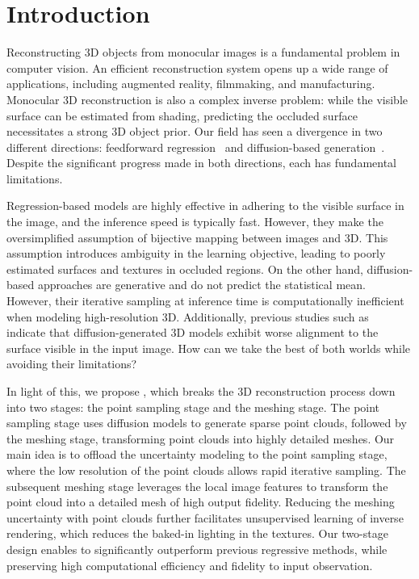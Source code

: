 \section{Introduction}
\label{sec:intro}

Reconstructing 3D objects from monocular images is a fundamental problem in computer vision. An efficient reconstruction system opens up a wide range of applications, including augmented reality, filmmaking, and manufacturing. Monocular 3D reconstruction is also a complex inverse problem: while the visible surface can be estimated from shading, predicting the occluded surface necessitates a strong 3D object prior. Our field has seen a divergence in two different directions: feedforward regression~\cite{choy20163d,wang2018pixel2mesh,mescheder2019occupancy,xu2019disn,groueix2018,wu2017marrnet,huang2023shapeclipper,wu2023multiview,huang2024zeroshape,hong2023lrm,TripoSR2024,tang2024lgm,zhang2024gs,xu2024instantmesh,wang2024crm,sf3d2024} and diffusion-based generation~\cite{nichol2022point,jun2023shap,liu2023one2345++,shue20233d,chou2023diffusion,shim2023diffusion,cheng2023sdfusion,li2023diffusion,liu2023zero,shi2023mvdream,liu2023syncdreamer,huang2024pointinfinity,yariv2024mosaic,chen2023single,zhao2023michelangelo,lan2024ln3diff}. Despite the significant progress made in both directions, each has fundamental limitations.

Regression-based models are highly effective in adhering to the visible surface in the image, and the inference speed is typically fast. However, they make the oversimplified assumption of bijective mapping between images and 3D. This assumption introduces ambiguity in the learning objective, leading to poorly estimated surfaces and textures in occluded regions. On the other hand, diffusion-based approaches are generative and do not predict the statistical mean. However, their iterative sampling at inference time is computationally inefficient when modeling high-resolution 3D. Additionally, previous studies such as~\cite{huang2024zeroshape} indicate that diffusion-generated 3D models exhibit worse alignment to the surface visible in the input image. How can we take the best of both worlds while avoiding their limitations?

In light of this, we propose \method, which breaks the 3D reconstruction process down into two stages: the point sampling stage and the meshing stage. The point sampling stage uses diffusion models to generate sparse point clouds, followed by the meshing stage, transforming point clouds into highly detailed meshes. Our main idea is to offload the uncertainty modeling to the point sampling stage, where the low resolution of the point clouds allows rapid iterative sampling. The subsequent meshing stage leverages the local image features to transform the point cloud into a detailed mesh of high output fidelity. Reducing the meshing uncertainty with point clouds further facilitates unsupervised learning of inverse rendering, which reduces the baked-in lighting in the textures. Our two-stage design enables \method to significantly outperform previous regressive methods, while preserving high computational efficiency and fidelity to input observation.

